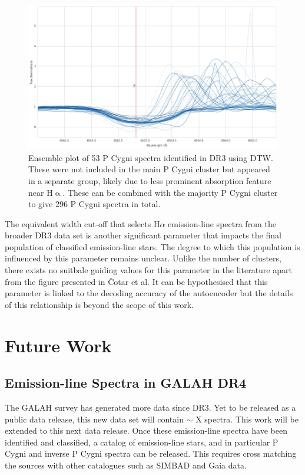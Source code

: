 \begin{figure}[!htb]
\centering
\includegraphics[scale=0.45]{figures/p cugni 2.png}
\caption{Ensemble plot of 53 P Cygni spectra identified in DR3 using DTW. These were not included in the main P Cygni cluster but appeared in a separate group, likely due to less prominent absorption feature near H$\upalpha$. These can be combined with the majority P Cygni cluster to give 296 P Cygni spectra in total.}
\end{figure}

The equivalent width cut-off that selects H$\alpha$ emission-line spectra from the broader DR3 data set is another significant parameter that impacts the final population of classified emission-line stars. The degree to which this population is influenced by this parameter remains unclear. Unlike the number of clusters, there exists no suitbale guiding values for this parameter in the literature apart from the figure presented in Čotar et al. It can be hypothesised that this parameter is linked to the decoding accuracy of the autoencoder but the details of this relationship is beyond the scope of this work. 

\section{Future Work}

\subsection{Emission-line Spectra in GALAH DR4}

The GALAH survey has generated more data since DR3. Yet to be released as a public data release, this new data set will contain $\sim$ X spectra. This work will be extended to this next data release. Once these emission-line spectra have been identified and classified, a catalog of emission-line stars, and in particular P Cygni and inverse P Cygni spectra can be released. This requires cross matching the sources with other catalogues such as SIMBAD and Gaia data.


